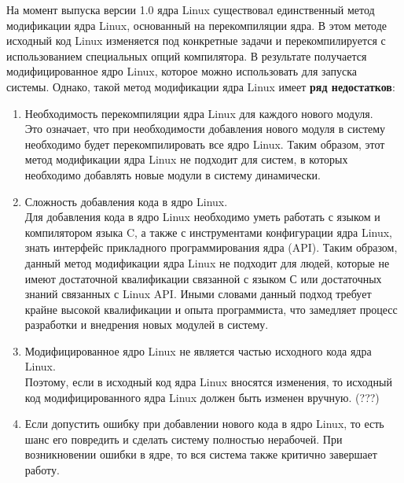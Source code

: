 На момент выпуска версии 1.0 ядра Linux существовал единственный метод модификации ядра Linux, основанный на перекомпиляции ядра.
В этом методе исходный код Linux изменяется под конкретные задачи и перекомпилируется с использованием специальных опций компилятора.
В результате получается модифицированное ядро Linux, которое можно использовать для запуска системы.
Однако, такой метод модификации ядра Linux имеет \textbf{ряд недостатков}:
\begin{enumerate}
    \item Необходимость перекомпиляции ядра Linux для каждого нового модуля. \vspace{5mm}\\
    Это означает, что при необходимости добавления нового модуля в систему необходимо будет перекомпилировать все ядро Linux.
    Таким образом, этот метод модификации ядра Linux не подходит для систем, в которых необходимо добавлять новые модули в систему динамически.

    \item Сложность добавления кода в ядро Linux. \vspace{5mm}\\
    Для добавления кода в ядро Linux необходимо уметь работать с языком и компилятором языка C, а также с инструментами конфигурации ядра Linux, знать интерфейс прикладного программирования ядра (API)\cite{API-linux}.
    Таким образом, данный метод модификации ядра Linux не подходит для людей, которые не имеют достаточной квалификации связанной с языком С или достаточных знаний связанных с Linux API\@.
    Иными словами данный подход требует крайне высокой квалификации и опыта программиста, что замедляет процесс разработки и внедрения новых модулей в систему.
    \vspace{5mm}\\
    \item Модифицированное ядро Linux не является частью исходного кода ядра Linux. \vspace{5mm}\\
    Поэтому, если в исходный код ядра Linux вносятся изменения, то исходный код модифицированного ядра Linux должен быть изменен вручную. (???)

    \item Если допустить ошибку при добавлении нового кода в ядро Linux, то есть шанс его повредить и сделать систему полностью нерабочей.
    При возникновении ошибки в ядре, то вся система также критично завершает работу.
\end{enumerate}

